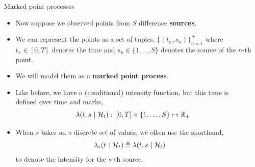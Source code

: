 \documentclass[aspectratio=169]{beamer}
\begin{document}
\begin{frame}{Marked point processes}
    \begin{itemize}
        \itemsep1em
        
        \item Now suppose we observed points from $S$ difference \textbf{sources}.
        
        \item We can represent the points as a set of tuples, $\{(t_n, s_n)\}_{n=1}^N$ where $t_n \in [0,T]$ denotes the time and $s_n \in \{1,\ldots,S\}$ denotes the source of the $n$-th point. 
        
        \item We will model them as a \textbf{marked point process}.
        
        \item Like before, we have a (conditional) intensity function, but this time is defined over time and marks,
        \begin{align}
            \lambda(t, s ~\vert~ \mathcal{H}_t): \; [0, T] \times \{1, \ldots, S\} \mapsto \mathbb{R}_+
        \end{align}
        
        \item When $s$ takes on a discrete set of values, we often use the shorthand,
        \begin{align}
            \lambda_s(t ~\vert~ \mathcal{H}_t) &\triangleq \lambda(t, s ~\vert~ \mathcal{H}_t)
        \end{align}
        to denote the intensity for the $s$-th source.
    \end{itemize}
\end{frame}
\end{document}

